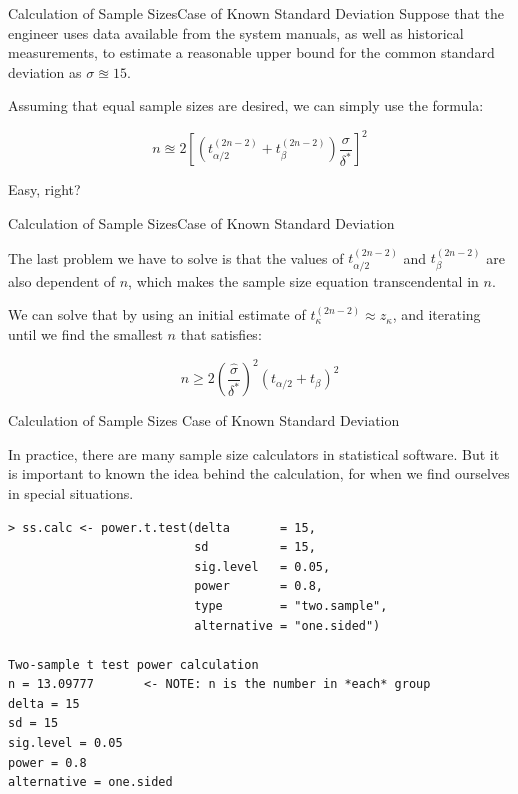 \begin{frame}{Calculation of Sample Sizes}{Case of Known Standard Deviation}
Suppose that the engineer uses data available from the system manuals, as well as historical measurements, to estimate a reasonable upper bound for the common standard deviation as $\sigma \approxeq 15$.\bigskip

Assuming that equal sample sizes are desired, we can simply use the formula:

\begin{equation*}
n \approxeq 2\left[\left(t^{(2n-2)}_{\alpha/2}+t^{(2n-2)}_{\beta}\right)\frac{\sigma}{\delta^*}\right]^2
\end{equation*}
\vfill

\hfill Easy, right?
\end{frame}

\begin{frame}{Calculation of Sample Sizes}{Case of Known Standard Deviation}

The last problem we have to solve is that the values of $t^{(2n-2)}_{\alpha/2}$ and $t^{(2n-2)}_{\beta}$ are also dependent of $n$, which makes the sample size equation transcendental in $n$.\bigskip

We can solve that by using an initial estimate of $t^{(2n-2)}_{\kappa}\approx z_{\kappa}$, and iterating until we find the smallest $n$ that satisfies:

\begin{equation*}
  n \geq 2 \left(\frac{\hat{\sigma}}{\delta^*}\right)^2\left(t_{\alpha/2}+t_{\beta}\right)^2
\end{equation*}
\end{frame}


\begin{frame}[fragile]{Calculation of Sample Sizes}
{Case of Known Standard Deviation}

In practice, there are many sample size calculators in statistical software. But it is important to known the idea behind the calculation, for when we find ourselves in special situations.

{\smaller
\begin{verbatim}
> ss.calc <- power.t.test(delta       = 15,
                          sd          = 15,
                          sig.level   = 0.05,
                          power       = 0.8,
                          type        = "two.sample",
                          alternative = "one.sided")

Two-sample t test power calculation
n = 13.09777       <- NOTE: n is the number in *each* group
delta = 15
sd = 15
sig.level = 0.05
power = 0.8
alternative = one.sided
\end{verbatim}}
\end{frame}

